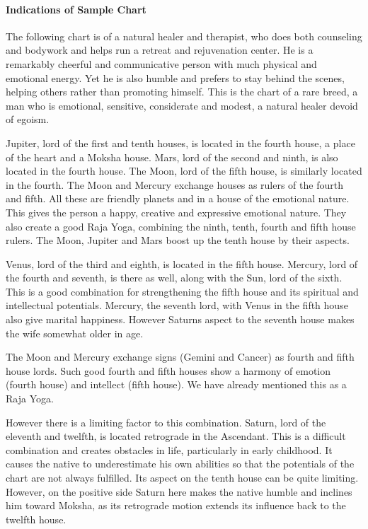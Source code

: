  

\paragraph{Indications of Sample Chart}

 

The following chart is of a natural healer and therapist, who does both counseling and bodywork and helps run a retreat and rejuvenation center. He is a remarkably cheerful and communicative person with much physical and emotional energy. Yet he is also humble and prefers to stay behind the scenes, helping others rather than promoting himself. This is the chart of a rare breed, a man who is emotional, sensitive, considerate and modest, a natural healer devoid of egoism.

 

Jupiter, lord of the first and tenth houses, is located in the fourth house, a place of the heart and a Moksha house. Mars, lord of the second and ninth, is also located in the fourth house. The Moon, lord of the fifth house, is similarly located in the fourth. The Moon and Mercury exchange houses as rulers of the fourth and fifth. All these are friendly planets and in a house of the emotional nature. This gives the person a happy, creative and expressive emotional nature. They also create a good Raja Yoga, combining the ninth, tenth, fourth and fifth house rulers. The Moon, Jupiter and Mars boost up the tenth house by their aspects.

 

Venus, lord of the third and eighth, is located in the fifth house. Mercury, lord of the fourth and seventh, is there as well, along with the Sun, lord of the sixth. This is a good combination for strengthening the fifth house and its spiritual and intellectual potentials. Mercury, the seventh lord, with Venus in the fifth house also give marital happiness. However Saturns aspect to the seventh house makes the wife somewhat older in age.

 

The Moon and Mercury exchange signs (Gemini and Cancer) as fourth and fifth house lords. Such good fourth and fifth houses show a harmony of emotion (fourth house) and intellect (fifth house). We have already mentioned this as a Raja Yoga.

 

However there is a limiting factor to this combination. Saturn, lord of the eleventh and twelfth, is located retrograde in the Ascendant. This is a difficult combination and creates obstacles in life, particularly in early childhood. It causes the native to underestimate his own abilities so that the potentials of the chart are not always fulfilled. Its aspect on the tenth house can be quite limiting. However, on the positive side Saturn here makes the native humble and inclines him toward Moksha, as its retrograde motion extends its influence back to the twelfth house.

